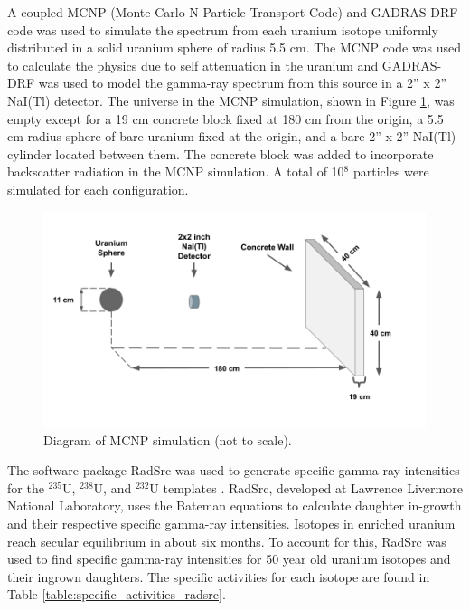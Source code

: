 A coupled MCNP (Monte Carlo N-Particle Transport Code) and GADRAS-DRF code was used to simulate the spectrum from each uranium isotope uniformly distributed in a solid uranium sphere of radius 5.5 cm. The MCNP code was used to calculate the physics due to self attenuation in the uranium and GADRAS-DRF was used to model the gamma-ray spectrum from this source in a 2'' x 2'' NaI(Tl) detector. The universe in the MCNP simulation, shown in Figure \ref{fig:mcnp_diagram}, was empty except for a 19 cm concrete block fixed at 180 cm from the origin, a 5.5 cm radius sphere of bare uranium fixed at the origin, and a bare 2'' x 2'' NaI(Tl) cylinder located between them. The concrete block was added to incorporate backscatter radiation in the MCNP simulation. A total of 10$^{8}$ particles were simulated for each configuration.

\begin{figure}[H]
	\centering
    \includegraphics[trim=50 50 50 50,clip,width=0.99\linewidth]{images/mcnp_diagram.png}
	\caption{Diagram of MCNP simulation (not to scale).}
	\label{fig:mcnp_diagram}
\end{figure}

The software package RadSrc was used to generate specific gamma-ray intensities for the $^{235}$U, $^{238}$U, and $^{232}$U templates \cite{Hiller2007}. RadSrc, developed at Lawrence Livermore National Laboratory, uses the Bateman equations to calculate daughter in-growth and their respective specific gamma-ray intensities. Isotopes in enriched uranium reach secular equilibrium in about six months. To account for this, RadSrc was used to find specific gamma-ray intensities for 50 year old uranium isotopes and their ingrown daughters. The specific activities for each isotope are found in Table \ref{table:specific_activities_radsrc}.

